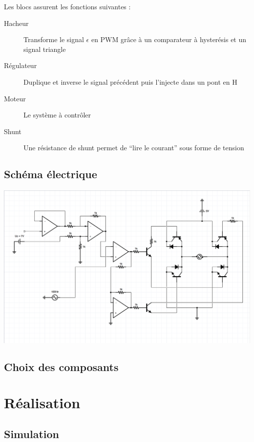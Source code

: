 \documentclass[a4paper]{article}
\begin{document}
Les blocs assurent les fonctions suivantes :
\begin{description}
  \item[Hacheur] 	Transforme le signal $\epsilon$ en PWM grâce à un comparateur à hysterésis et un signal triangle
  \item[Régulateur] Duplique et inverse le signal précédent puis l'injecte dans un pont en H
  \item[Moteur] 	Le système à contrôler
  \item[Shunt] 		Une résistance de shunt permet de “lire le courant” sous forme de tension
\end{description}

\subsection{Schéma électrique}
\begin{center}
	\includegraphics[width=1\textwidth]{schema}
\end{center}


\subsection{Choix des composants}

\section{Réalisation}

\subsection{Simulation}
\end{document}
